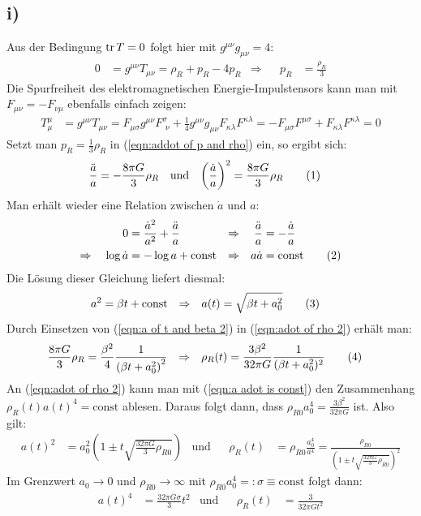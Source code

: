 \documentclass[a4paper,12pt]{article}
\newcommand\numberthis{\addtocounter{equation}{1}\tag{\theequation}}
\newcommand{\kla}{}
\newcommand{\tecxt}{}
\begin{document}
\subsection*{i)}Aus der Bedingung $\tecxt\text{tr\,}T=0$ folgt hier mit $g^{\mu\nu}g_{\mu\nu}=4$:
\begin{align*}
0&=g^{\mu\nu}T_{\mu\nu}=\rho_R+p_R-4p_R&\Rightarrow &&p_R&=\frac{\rho_R}{3}
\end{align*}
Die Spurfreiheit des elektromagnetischen Energie-Impulstensors kann man mit $F_{\mu\nu}=-F_{\nu\mu}$ ebenfalls einfach zeigen:
\begin{align*}
T_\mu^\mu&=g^{\mu\nu}T_{\mu\nu}=F_{\mu\sigma}g^{\mu\nu}F_{\ \, \nu}^\sigma+\frac{1}{4}g^{\mu\nu}g_{\mu\nu}F_{\kappa\lambda}F^{\kappa\lambda}=-F_{\mu\sigma}F^{\mu\sigma}+F_{\kappa\lambda}F^{\kappa\lambda}=0
\end{align*}
Setzt man $p_R=\frac{1}{3}\rho_R$ in (\ref{eqn:addot of p and rho}) ein, so ergibt sich:
\begin{align*}
\frac{\ddot{a}}{a}&=-\frac{8\pi G}{3}\rho_R&\tecxt\text{und}&&\kla\left( {\frac{\dot{a}}{a}} \right)^2&=\frac{8\pi G}{3}\rho_R\numberthis\label{eqn:adot of rho 2}
\end{align*}
Man erhält wieder eine Relation zwischen $\dot{a}$ und $a$:
\begin{align*}
0&=\frac{\dot{a}^2}{a^2}+\frac{\ddot{a}}{a}&\Rightarrow &&\frac{\ddot{a}}{a}&=-\frac{\dot{a}}{a}\\
\Rightarrow\ \ \ \log\dot{a}&=-\log a+\tecxt\text{const}&\Rightarrow &&a\dot{a}&=\tecxt\text{const}\numberthis\label{eqn:a adot is const}
\end{align*}
Die Lösung dieser Gleichung liefert diesmal:
\begin{align*}
a^2&=\beta t+\tecxt\text{const}&\Rightarrow &&a(t)&=\sqrt{\beta t+a_0^2}\numberthis\label{eqn:a of t and beta 2}
\end{align*}
Durch Einsetzen von (\ref{eqn:a of t and beta 2}) in (\ref{eqn:adot of rho 2}) erhält man:
\begin{align*}
\frac{8\pi G}{3}\rho_R&=\frac{\beta^2}{4}\frac{1}{\kla\left( {\beta t+a_0^2} \right)^2}&\Rightarrow &&\rho_R(t)&=\frac{3\beta^2}{32\pi G}\frac{1}{(\beta t+a_0^2)^2}\numberthis\label{eqn:rho of t and beta 2}
\end{align*} 
An (\ref{eqn:adot of rho 2}) kann man mit (\ref{eqn:a adot is const}) den Zusammenhang $\rho_R(t)a(t)^4=\tecxt\text{const}$ ablesen. Daraus folgt dann, dass $\rho_{R0}a_0^4=\frac{3\beta^2}{32\pi G}$ ist. Also gilt:
\begin{align*}
a(t)^2&=a_0^2\kla\left( {1\pm t\sqrt{\frac{32\pi G}{3}\rho_{R0}}} \right)&\tecxt\text{und}&&\rho_R(t)&=\rho_{R0}\frac{a_0^4}{a^4}=\frac{\rho_{R0}}{\kla\left( {1\pm t\sqrt{\frac{32\pi G}{3}\rho_{R0}}} \right)^2}
\end{align*}
Im Grenzwert $a_0\rightarrow 0$ und $\rho_{R0}\rightarrow\infty$ mit $\rho_{R0}a_0^4=:\sigma\equiv\tecxt\text{const}$ folgt dann:
\begin{align*}
a(t)^4&=\frac{32\pi G\sigma}{3}t^2&\tecxt\text{und}&&\rho_R(t)&=\frac{3}{32\pi Gt^2}
\end{align*}
\end{document}
